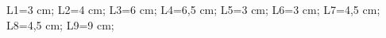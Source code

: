 \documentclass[exercice]{thedocument}%
\begin{document}
%
\>L1=3 cm;%
\>L2=4 cm;%
\>L3=6 cm;%
\>L4=6,5 cm;%
\>L5=3 cm;%
\>L6=3 cm;%
\>L7=4,5 cm;%
\>L8=4,5 cm;%
\>L9=9 cm;%
%
\end{document}
